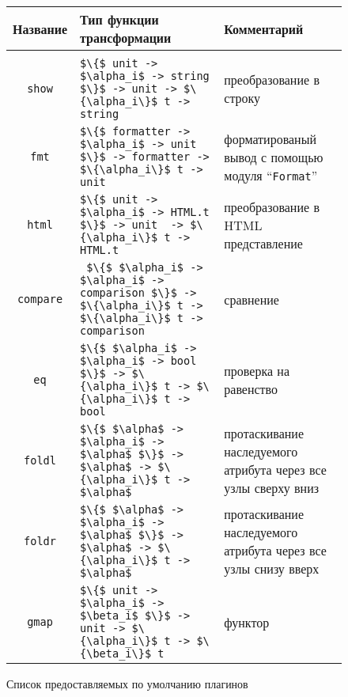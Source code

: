 \begin{figure}[t]
  \center
  \small
  \begin{tabular}{cp{9cm}p{5cm}}
    Название & Тип функции трансформации & Комментарий \\[3mm]
    \hline\\
    \lstinline|show| & \lstinline|$\{$ unit -> $\alpha_i$ -> string $\}$ -> unit -> $\{\alpha_i\}$ t -> string| & преобразование в строку\\[2mm]
    \lstinline|fmt| & \lstinline|$\{$ formatter -> $\alpha_i$ -> unit $\}$ -> formatter -> $\{\alpha_i\}$ t -> unit| & форматированый вывод с помощью модуля ``\lstinline|Format|'' \\[2mm]
    \lstinline|html| & \lstinline|$\{$ unit -> $\alpha_i$ -> HTML.t $\}$ -> unit  -> $\{\alpha_i\}$ t -> HTML.t| & преобразование в HTML представление \\[2mm]
    \lstinline|compare| & \lstinline| $\{$ $\alpha_i$ -> $\alpha_i$ -> comparison $\}$ -> $\{\alpha_i\}$ t -> $\{\alpha_i\}$ t -> comparison| & сравнение \\[2mm]
    \lstinline|eq| & \lstinline|$\{$ $\alpha_i$ -> $\alpha_i$ -> bool $\}$ -> $\{\alpha_i\}$ t -> $\{\alpha_i\}$ t -> bool| & проверка на равенство \\[2mm]
    \lstinline|foldl| & \lstinline |$\{$ $\alpha$ -> $\alpha_i$ -> $\alpha$ $\}$ -> $\alpha$ -> $\{\alpha_i\}$ t -> $\alpha$| & протаскивание наследуемого атрибута через все узлы сверху вниз \\[2mm]
    \lstinline|foldr| & \lstinline |$\{$ $\alpha$ -> $\alpha_i$ -> $\alpha$ $\}$ -> $\alpha$ -> $\{\alpha_i\}$ t -> $\alpha$| & протаскивание наследуемого атрибута через все узлы снизу вверх \\[2mm]
    \lstinline|gmap| & \lstinline|$\{$ unit -> $\alpha_i$ -> $\beta_i$ $\}$ -> unit -> $\{\alpha_i\}$ t -> $\{\beta_i\}$ t| & функтор %
  \end{tabular}
  \caption{Список предоставляемых по умолчанию плагинов}
  \label{listofplugins}
\end{figure}

